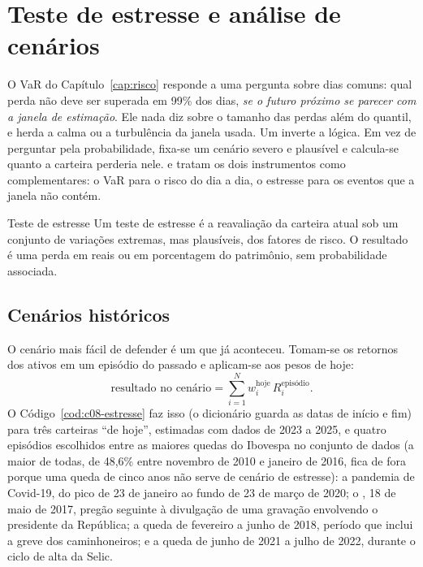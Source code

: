 \section{Teste de estresse e análise de cenários}
\label{sec:c08-estresse}

O VaR do Capítulo~\ref{cap:risco} responde a uma pergunta sobre dias comuns: qual perda não deve ser superada em 99\% dos dias, \emph{se o futuro próximo se parecer com a janela de estimação}. Ele nada diz sobre o tamanho das perdas além do quantil, e herda a calma ou a turbulência da janela usada. Um  inverte a lógica. Em vez de perguntar pela probabilidade, fixa-se um cenário severo e plausível e calcula-se quanto a carteira perderia nele. \citet{jorion2007} e \citet{hull2018} tratam os dois instrumentos como complementares: o VaR para o risco do dia a dia, o estresse para os eventos que a janela não contém.

\begin{definicao}{Teste de estresse}
Um teste de estresse é a reavaliação da carteira atual sob um conjunto de variações extremas, mas plausíveis, dos fatores de risco. O resultado é uma perda em reais ou em porcentagem do patrimônio, sem probabilidade associada.
\end{definicao}

\subsection{Cenários históricos}

O cenário mais fácil de defender é um que já aconteceu. Tomam-se os retornos dos ativos em um episódio do passado e aplicam-se aos pesos de hoje:
\begin{equation}
  \text{resultado no cenário} = \sum_{i=1}^{N} w_i^{\text{hoje}}\, R_i^{\text{episódio}} .
  \label{eq:c08-historico}
\end{equation}
O Código~\ref{cod:c08-estresse} faz isso (o dicionário  guarda as datas de início e fim) para três carteiras ``de hoje'', estimadas com dados de 2023 a 2025, e quatro episódios escolhidos entre as maiores quedas do Ibovespa no conjunto de dados (a maior de todas, de 48,6\% entre novembro de 2010 e janeiro de 2016, fica de fora porque uma queda de cinco anos não serve de cenário de estresse): a pandemia de Covid-19, do pico de 23 de janeiro ao fundo de 23 de março de 2020; o , 18 de maio de 2017, pregão seguinte à divulgação de uma gravação envolvendo o presidente da República; a queda de fevereiro a junho de 2018, período que inclui a greve dos caminhoneiros; e a queda de junho de 2021 a julho de 2022, durante o ciclo de alta da Selic.


